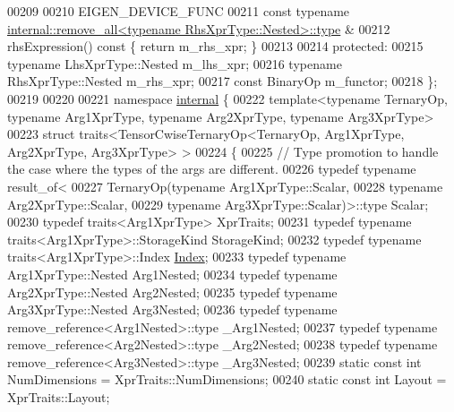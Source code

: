 \begin{DoxyCode}
00209 
00210     EIGEN\_DEVICE\_FUNC
00211     \textcolor{keyword}{const} \textcolor{keyword}{typename} \hyperlink{group___sparse_core___module}{internal::remove\_all<typename RhsXprType::Nested>::type}
      &
00212     rhsExpression()\textcolor{keyword}{ const }\{ \textcolor{keywordflow}{return} m\_rhs\_xpr; \}
00213 
00214   \textcolor{keyword}{protected}:
00215     \textcolor{keyword}{typename} LhsXprType::Nested m\_lhs\_xpr;
00216     \textcolor{keyword}{typename} RhsXprType::Nested m\_rhs\_xpr;
00217     \textcolor{keyword}{const} BinaryOp m\_functor;
00218 \};
00219 
00220 
00221 \textcolor{keyword}{namespace }\hyperlink{namespaceinternal}{internal} \{
00222 \textcolor{keyword}{template}<\textcolor{keyword}{typename} TernaryOp, \textcolor{keyword}{typename} Arg1XprType, \textcolor{keyword}{typename} Arg2XprType, \textcolor{keyword}{typename} Arg3XprType>
00223 \textcolor{keyword}{struct }traits<TensorCwiseTernaryOp<TernaryOp, Arg1XprType, Arg2XprType, Arg3XprType> >
00224 \{
00225   \textcolor{comment}{// Type promotion to handle the case where the types of the args are different.}
00226   \textcolor{keyword}{typedef} \textcolor{keyword}{typename} result\_of<
00227       TernaryOp(\textcolor{keyword}{typename} Arg1XprType::Scalar,
00228                 \textcolor{keyword}{typename} Arg2XprType::Scalar,
00229                 \textcolor{keyword}{typename} Arg3XprType::Scalar)>::type Scalar;
00230   \textcolor{keyword}{typedef} traits<Arg1XprType> XprTraits;
00231   \textcolor{keyword}{typedef} \textcolor{keyword}{typename} traits<Arg1XprType>::StorageKind StorageKind;
00232   \textcolor{keyword}{typedef} \textcolor{keyword}{typename} traits<Arg1XprType>::Index \hyperlink{namespace_eigen_a62e77e0933482dafde8fe197d9a2cfde}{Index};
00233   \textcolor{keyword}{typedef} \textcolor{keyword}{typename} Arg1XprType::Nested Arg1Nested;
00234   \textcolor{keyword}{typedef} \textcolor{keyword}{typename} Arg2XprType::Nested Arg2Nested;
00235   \textcolor{keyword}{typedef} \textcolor{keyword}{typename} Arg3XprType::Nested Arg3Nested;
00236   \textcolor{keyword}{typedef} \textcolor{keyword}{typename} remove\_reference<Arg1Nested>::type \_Arg1Nested;
00237   \textcolor{keyword}{typedef} \textcolor{keyword}{typename} remove\_reference<Arg2Nested>::type \_Arg2Nested;
00238   \textcolor{keyword}{typedef} \textcolor{keyword}{typename} remove\_reference<Arg3Nested>::type \_Arg3Nested;
00239   \textcolor{keyword}{static} \textcolor{keyword}{const} \textcolor{keywordtype}{int} NumDimensions = XprTraits::NumDimensions;
00240   \textcolor{keyword}{static} \textcolor{keyword}{const} \textcolor{keywordtype}{int} Layout = XprTraits::Layout;

\end{DoxyCode}
